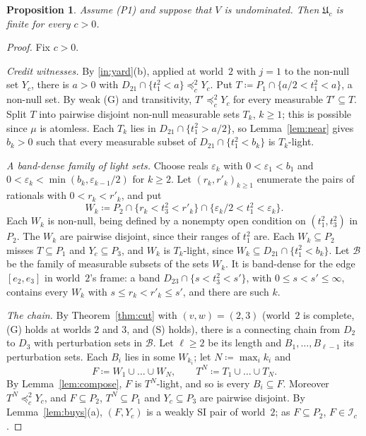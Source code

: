 \documentclass[11pt]{article}
\newtheorem{proposition}[theorem]{Proposition}
\theoremstyle{definition}\newtheorem{definition}[theorem]{Definition}
\theoremstyle{remark}\newtheorem{remark}[theorem]{Remark}
\newcommand{\Bfam}{\mathcal B}
\newcommand{\Iid}{\mathcal I}
\newcommand{\UU}{\mathfrak U}
\begin{document}
\begin{proposition}\label{prop:finite}
Assume (P1) and suppose that $V$ is undominated. Then $\UU_c$ is finite for
every $c>0$.
\end{proposition}
\begin{proof}
Fix $c>0$.

\emph{Credit witnesses.} By \ref{in:yard}(b), applied at world~$2$ with
$j=1$ to the non-null set $Y_c$, there is $a>0$ with
$D_{21}\cap\{t^2_1<a\}\preceq^2_cY_c$. Put
$T\coloneqq P_1\cap\{a/2<t^2_1<a\}$, a non-null set. By weak (G) and
transitivity, $T'\preceq^2_cY_c$ for every measurable $T'\subseteq T$.
Split $T$ into pairwise disjoint non-null measurable sets $T_k$, $k\ge1$;
this is possible since $\mu$ is atomless. Each $T_k$ lies in
$D_{21}\cap\{t^2_1>a/2\}$, so Lemma~\ref{lem:near} gives $b_k>0$ such that
every measurable subset of $D_{21}\cap\{t^2_1<b_k\}$ is $T_k$-light.

\emph{A band-dense family of light sets.} Choose reals $\varepsilon_k$ with
$0<\varepsilon_1<b_1$ and $0<\varepsilon_k<\min(b_k,\varepsilon_{k-1}/2)$
for $k\ge2$. Let $(r_k,r'_k)_{k\ge1}$ enumerate the pairs of rationals with
$0<r_k<r'_k$, and put
\[
 W_k\coloneqq P_2\cap\{r_k<t^2_3<r'_k\}\cap
 \{\varepsilon_k/2<t^2_1<\varepsilon_k\}.
\]
Each $W_k$ is non-null, being defined by a nonempty open condition on
$(t^2_1,t^2_3)$ in $P_2$. The $W_k$ are pairwise disjoint, since their
ranges of $t^2_1$ are. Each $W_k\subseteq P_2$ misses $T\subseteq P_1$ and
$Y_c\subseteq P_3$, and $W_k$ is $T_k$-light, since
$W_k\subseteq D_{21}\cap\{t^2_1<b_k\}$. Let $\Bfam$ be the family of
measurable subsets of the sets $W_k$. It is band-dense for the edge
$[e_2,e_3]$ in world~$2$'s frame: a band $D_{23}\cap\{s<t^2_3<s'\}$, with
$0\le s<s'\le\infty$, contains every $W_k$ with $s\le r_k<r'_k\le s'$, and
there are such $k$.

\emph{The chain.} By Theorem~\ref{thm:cut} with $(v,w)=(2,3)$ (world~$2$ is
complete, (G) holds at worlds $2$ and $3$, and (S) holds), there is a
connecting chain from $D_2$ to $D_3$ with perturbation sets in $\Bfam$. Let
$\ell\ge2$ be its length and $B_1,\dots,B_{\ell-1}$ its perturbation sets.
Each $B_i$ lies in some $W_{k_i}$; let $N\coloneqq\max_ik_i$ and
\[
 F\coloneqq W_1\cup\dots\cup W_N,\qquad T^N\coloneqq T_1\cup\dots\cup T_N.
\]
By Lemma~\ref{lem:compose}, $F$ is $T^N$-light, and so is every
$B_i\subseteq F$. Moreover $T^N\preceq^2_cY_c$, and $F\subseteq P_2$,
$T^N\subseteq P_1$ and $Y_c\subseteq P_3$ are pairwise disjoint. By
Lemma~\ref{lem:buys}(a), $(F,Y_c)$ is a weakly SI pair of world~$2$; as
$F\subseteq P_2$, $F\in\Iid_c$.


\end{proof}
\end{document}
